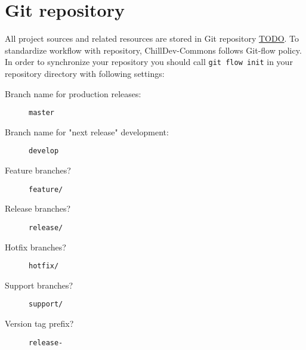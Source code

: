 %

\section{Git repository}

All project sources and related resources are stored in Git repository \url{TODO}. To standardize workflow with repository, ChillDev-Commons follows Git-flow policy. In order to synchronize your repository you should call \texttt{git flow init} in your repository directory with following settings:

\begin{description}
    \item[Branch name for production releases:]
    \texttt{master}

    \item[Branch name for "next release" development:]
    \texttt{develop}

    \item[Feature branches?]
    \texttt{feature/}

    \item[Release branches?]
    \texttt{release/}

    \item[Hotfix branches?]
    \texttt{hotfix/}

    \item[Support branches?]
    \texttt{support/}

    \item[Version tag prefix?]
    \texttt{release-}
\end{description}
